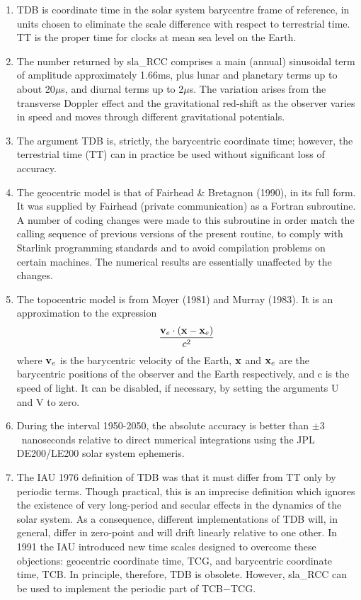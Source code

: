 \documentclass[11pt,twoside]{article}
\begin{document}
{
 \begin{enumerate}
  \item TDB is coordinate time in the solar system barycentre frame
        of reference, in units chosen to eliminate the scale difference
        with respect to terrestrial time.  TT is the proper
        time for clocks at mean sea level on the Earth.
  \item The number returned by sla\_RCC comprises
        a main (annual) sinusoidal term of amplitude
        approximately 1.66ms, plus lunar and planetary terms up to about
        20$\mu$s, and diurnal terms up to 2$\mu$s.  The
        variation arises from the transverse Doppler effect and the
        gravitational red-shift as the observer varies in speed and
        moves through different gravitational potentials.
  \item The argument TDB is, strictly, the barycentric coordinate time;
        however, the terrestrial time (TT) can in practice be used without
        significant loss of accuracy.
  \item The geocentric model is that of Fairhead \& Bretagnon (1990), in
        its full form.  It was supplied by Fairhead (private communication)
        as a Fortran subroutine.  A number of coding changes were made to
        this subroutine in order
        match the calling sequence of previous versions of the present
        routine, to comply with Starlink programming standards and to
        avoid compilation problems on certain machines.  The
        numerical results are essentially unaffected by the
        changes.
  \item The topocentric model is from Moyer (1981) and Murray (1983).
        It is an approximation to the expression
        \[\frac{{\bf v}_e \cdot ( {\bf x} - {\bf x}_e )}{c^2}\]
        where ${\bf v}_e$ is the barycentric velocity of
        the Earth, ${\bf x}$ and ${\bf x}_e$ are the barycentric positions
        of the observer and the Earth respectively, and
        c is the speed of light.
        It can be disabled, if necessary, by setting the arguments
        U and V to zero.
  \item During the interval 1950-2050, the absolute accuracy
        is better than $\pm3$~nanoseconds
        relative to direct numerical integrations using the JPL DE200/LE200
        solar system ephemeris.
  \item The IAU 1976 definition of TDB was that it must differ from TT only by
        periodic terms.  Though practical, this is an imprecise definition
        which ignores the existence of very long-period and secular effects
        in the dynamics of the solar system.  As a consequence, different
        implementations of TDB will, in general, differ in zero-point and
        will drift linearly relative to one other.  In 1991 the IAU introduced
        new time scales designed to overcome these objections:  geocentric coordinate
        time, TCG, and barycentric coordinate time, TCB.  In principle, therefore,
        TDB is obsolete.  However, sla\_RCC
        can be used to implement the periodic part of TCB$-$TCG.
 \end{enumerate}
}
\end{document}
